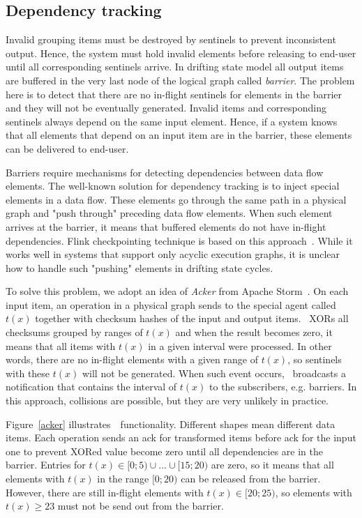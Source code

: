 \subsection{Dependency tracking}

Invalid grouping items must be destroyed by sentinels to prevent inconsistent output. Hence, the system must hold invalid elements before releasing to end-user until all corresponding sentinels arrive. In drifting state model all output items are buffered in the very last node of the logical graph called {\em barrier}. The problem here is to detect that there are no in-flight sentinels for elements in the barrier and they will not be eventually generated. Invalid items and corresponding sentinels always depend on the same input element. Hence, if a system knows that all elements that depend on an input item are in the barrier, these elements can be delivered to end-user. 

Barriers require mechanisms for detecting dependencies between data flow elements. The well-known solution for dependency tracking is to inject special elements in a data flow. These elements go through the same path in a physical graph and "push through" preceding data flow elements. When such element arrives at the barrier, it means that buffered elements do not have in-flight dependencies. Flink checkpointing technique is based on this approach~\cite{Carbone:2017:SMA:3137765.3137777}. While it works well in systems that support only acyclic execution graphs, it is unclear how to handle such "pushing" elements in drifting state cycles. 

To solve this problem, we adopt an idea of {\em Acker} from Apache Storm~\cite{apache:storm}. On each input item, an operation in a physical graph sends to the special agent called~{\em \Acker\ } $t(x)$ together with checksum hashes of the input and output items. \Acker\ XORs all checksums grouped by ranges of $t(x)$ and when the result becomes zero, it means that all items with $t(x)$ in a given interval were processed. In other words, there are no in-flight elements with a given range of $t(x)$, so sentinels with these $t(x)$ will not be generated. When such event occurs, \Acker\ broadcasts a notification that contains the interval of $t(x)$ to the subscribers, e.g. barriers. In this approach, collisions are possible, but they are very unlikely in practice.

Figure~\ref{acker} illustrates~\Acker\ functionality. Different shapes mean different data items. Each operation sends an ack for transformed items before ack for the input one to prevent XORed value become zero until all dependencies are in the barrier. Entries for $t(x) \in [0;5) \cup ... \cup [15;20)$ are zero, so it means that all elements with $t(x)$ in the range $[0;20)$ can be released from the barrier. However, there are still in-flight elements with $t(x) \in [20;25)$, so elements with $t(x) \geq 23$ must not be send out from the barrier.

